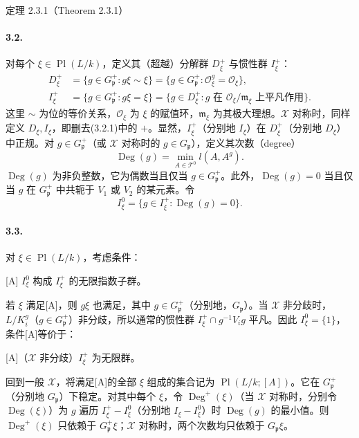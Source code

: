 \begin{originaltheorem}{定理 2.3.1（Theorem 2.3.1）}
\paragraph*{3.2.}
对每个 $\xi\in\operatorname{Pl}(L/k)$，定义其（超越）分解群 $D_\xi^+$ 与惯性群 $I_\xi^+$：
\[
\begin{aligned}
 D_\xi^+&=\{g\in G_{\mathfrak p}^+:g\xi\sim\xi\}
 =\{g\in G_{\mathfrak p}^+:\mathcal O_\xi^g=\mathcal O_\xi\},\\
 I_\xi^+&=\{g\in G_{\mathfrak p}^+:g\xi=\xi\}
 =\{g\in D_\xi^+:g\text{ 在 }\mathcal O_\xi/\mathfrak m_\xi\text{ 上平凡作用}\}.
\end{aligned}\tag{3.2.1}
\]
这里 $\sim$ 为位的等价关系，$\mathcal O_\xi$ 为 $\xi$ 的赋值环，$\mathfrak m_\xi$ 为其极大理想。$\mathcal X$ 对称时，同样定义 $D_\xi,I_\xi$，即删去(3.2.1)中的 $+$。显然，$I_\xi^+$（分别地 $I_\xi$）在 $D_\xi^+$（分别地 $D_\xi$）中正规。对 $g\in G_{\mathfrak p}^+$（或 $\mathcal X$ 对称时的 $g\in G_{\mathfrak p}$），定义其次数（degree）
\[
 \operatorname{Deg}(g)=\min_{A\in\mathcal T^0}l(A,A^g).\tag{3.2.2}
\]
$\operatorname{Deg}(g)$ 为非负整数，它为偶数当且仅当 $g\in G_{\mathfrak p}^+$。此外，$\operatorname{Deg}(g)=0$ 当且仅当 $g$ 在 $G_{\mathfrak p}^+$ 中共轭于 $V_1$ 或 $V_2$ 的某元素。令
\[
 I_\xi^0=\{g\in I_\xi^+:\operatorname{Deg}(g)=0\}.\tag{3.2.3}
\]

\paragraph*{3.3.}
对 $\xi\in\operatorname{Pl}(L/k)$，考虑条件：

[A] $I_\xi^0$ 构成 $I_\xi^+$ 的无限指数子群。

若 $\xi$ 满足[A]，则 $g\xi$ 也满足，其中 $g\in G_{\mathfrak p}^+$（分别地，$G_{\mathfrak p}$）。当 $\mathcal X$ 非分歧时，$L/K_i^g$（$g\in G_{\mathfrak p}^+$）非分歧，所以通常的惯性群 $I_\xi^+\cap g^{-1}V_ig$ 平凡。因此 $I_\xi^0=\{1\}$，条件[A]等价于：

[A]（$\mathcal X$ 非分歧）$I_\xi^+$ 为无限群。

回到一般 $\mathcal X$，将满足[A]的全部 $\xi$ 组成的集合记为 $\operatorname{Pl}(L/k;[A])$。它在 $G_{\mathfrak p}^+$（分别地 $G_{\mathfrak p}$）下稳定。对其中每个 $\xi$，令 $\operatorname{Deg}^+(\xi)$（当 $\mathcal X$ 对称时，分别令 $\operatorname{Deg}(\xi)$）为 $g$ 遍历 $I_\xi^+-I_\xi^0$（分别地 $I_\xi-I_\xi^0$）时 $\operatorname{Deg}(g)$ 的最小值。则 $\operatorname{Deg}^+(\xi)$ 只依赖于 $G_{\mathfrak p}^+\xi$；$\mathcal X$ 对称时，两个次数均只依赖于 $G_{\mathfrak p}\xi$。


\end{originaltheorem}

